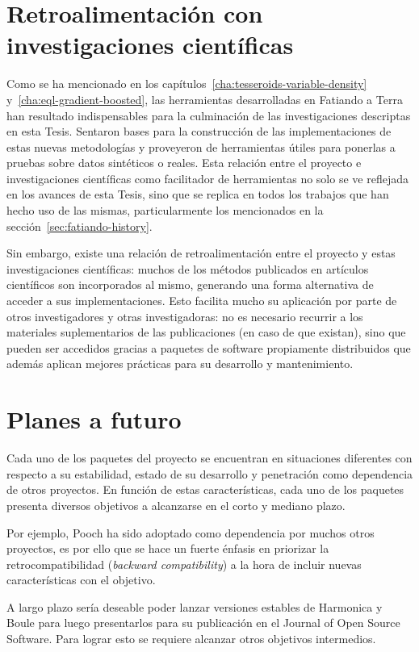 \section{Retroalimentación con investigaciones científicas}

Como se ha mencionado en los capítulos~\ref{cha:tesseroids-variable-density}
y~\ref{cha:eql-gradient-boosted}, las herramientas desarrolladas en Fatiando
a Terra han resultado indispensables para la culminación de las investigaciones
descriptas en esta Tesis.
Sentaron bases para la construcción de las implementaciones de estas nuevas
metodologías y proveyeron de herramientas útiles para ponerlas a pruebas
sobre datos sintéticos o reales.
Esta relación entre el proyecto e investigaciones científicas como facilitador
de herramientas no solo se ve reflejada en los avances de esta Tesis, sino que
se replica en todos los trabajos que han hecho uso de las mismas,
particularmente los mencionados en la sección~\ref{sec:fatiando-history}.

Sin embargo, existe una relación de retroalimentación entre el proyecto y estas
investigaciones científicas: muchos de los métodos publicados en artículos
científicos son incorporados al mismo, generando una forma alternativa de
acceder a sus implementaciones.
Esto facilita mucho su aplicación por parte de otros investigadores y otras
investigadoras: no es necesario recurrir a los materiales suplementarios de las
publicaciones (en caso de que existan), sino que pueden ser accedidos gracias
a paquetes de software propiamente distribuidos que además aplican mejores
prácticas para su desarrollo y mantenimiento.


\section{Planes a futuro}

Cada uno de los paquetes del proyecto se encuentran en situaciones diferentes
con respecto a su estabilidad, estado de su desarrollo y penetración como
dependencia de otros proyectos.
En función de estas características, cada uno de los paquetes presenta diversos
objetivos a alcanzarse en el corto y mediano plazo.

Por ejemplo, Pooch ha sido adoptado como dependencia por muchos otros
proyectos, es por ello que se hace un fuerte énfasis en priorizar la
retrocompatibilidad (\emph{backward compatibility}) a la hora de incluir nuevas
características con el objetivo.

A largo plazo sería deseable poder lanzar versiones estables de Harmonica
y Boule para luego presentarlos para su publicación en el Journal of Open
Source Software.
Para lograr esto se requiere alcanzar otros objetivos intermedios.

